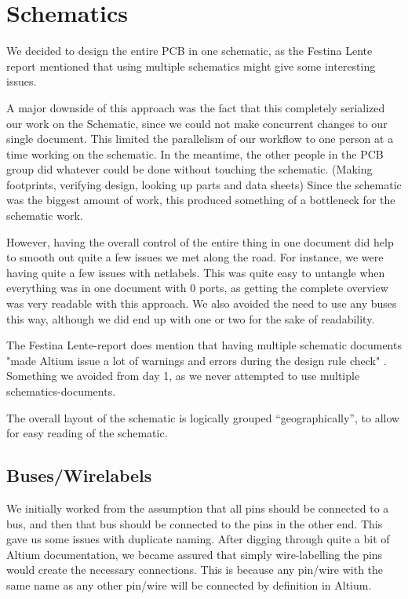 \section {Schematics}

We decided to design the entire \ac{PCB} in one schematic, as the Festina Lente
report mentioned that using multiple schematics might give
some interesting issues.

A major downside of this approach was the fact that this completely serialized
our work on the Schematic, since we could not make concurrent changes to our
single document. This limited the parallelism of our workflow to one person at a
time working on the schematic.  In the meantime, the other people in the
\ac{PCB} group did whatever could be done without touching the
schematic. (Making footprints, verifying design, looking up parts and data
sheets) Since the schematic was the biggest amount of work, this produced
something of a bottleneck for the schematic work.

However, having the overall control of the entire thing in one document
did help to smooth out quite a few issues we met along the road. For instance,
we were having quite a few issues with netlabels. This was quite easy to
untangle when everything was in one document with 0 ports, as getting the
complete overview was very readable with this approach. We also avoided the need
to use any buses this way, although we did end up with one or two for the sake
of readability.

The Festina Lente-report does mention that having multiple schematic
documents "made Altium issue a lot of warnings and errors during the design rule check"
. Something we avoided from day 1, as we never attempted to
use multiple schematics-documents.

The overall layout of the schematic is logically grouped ``geographically'', to
allow for easy reading of the schematic.

\subsection {Buses/Wirelabels}
We initially worked from the assumption that all pins should be connected to a
bus, and then that bus should be connected to the pins in the other end. This
gave us some issues with duplicate naming. After digging through quite a bit of
Altium documentation, we became assured that simply wire-labelling the pins
would create the necessary connections. This is because any pin/wire with the
same name as any other pin/wire will be connected by definition in Altium.

